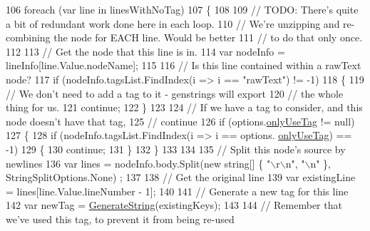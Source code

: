 \begin{DoxyCode}
106                 \textcolor{keywordflow}{foreach} (var line \textcolor{keywordflow}{in} linesWithNoTag)
107                 \{
108 
109                     \textcolor{comment}{// TODO: There's quite a bit of redundant work done here in each loop.}
110                     \textcolor{comment}{// We're unzipping and re-combining the node for EACH line. Would be better}
111                     \textcolor{comment}{// to do that only once.}
112 
113                     \textcolor{comment}{// Get the node that this line is in.}
114                     var nodeInfo = lineInfo[line.Value.nodeName];
115 
116                     \textcolor{comment}{// Is this line contained within a rawText node?}
117                     \textcolor{keywordflow}{if} (nodeInfo.tagsList.FindIndex(i => i == \textcolor{stringliteral}{"rawText"}) != -1)
118                     \{
119                         \textcolor{comment}{// We don't need to add a tag to it - genstrings will export}
120                         \textcolor{comment}{// the whole thing for us.}
121                         \textcolor{keywordflow}{continue};
122                     \}
123 
124                     \textcolor{comment}{// If we have a tag to consider, and this node doesn't have that tag,}
125                     \textcolor{comment}{// continue}
126                     \textcolor{keywordflow}{if} (options.\hyperlink{a00037_ab6162338f9606a836f3101fe0e228249}{onlyUseTag} != null)
127                     \{
128                         \textcolor{keywordflow}{if} (nodeInfo.tagsList.FindIndex(i => i == options.
      \hyperlink{a00037_ab6162338f9606a836f3101fe0e228249}{onlyUseTag}) == -1)
129                         \{
130                             \textcolor{keywordflow}{continue};
131                         \}
132                     \}
133 
134 
135                     \textcolor{comment}{// Split this node's source by newlines}
136                     var lines = nodeInfo.body.Split(\textcolor{keyword}{new} \textcolor{keywordtype}{string}[] \{ \textcolor{stringliteral}{"\(\backslash\)r\(\backslash\)n"}, \textcolor{stringliteral}{"\(\backslash\)n"} \}, StringSplitOptions.None)
      ;
137 
138                     \textcolor{comment}{// Get the original line}
139                     var existingLine = lines[line.Value.lineNumber - 1];
140 
141                     \textcolor{comment}{// Generate a new tag for this line}
142                     var newTag = \hyperlink{a00130_a91ad68b679bd3b0bd89fe92ea5068688}{GenerateString}(existingKeys);
143 
144                     \textcolor{comment}{// Remember that we've used this tag, to prevent it from being re-used}

\end{DoxyCode}
